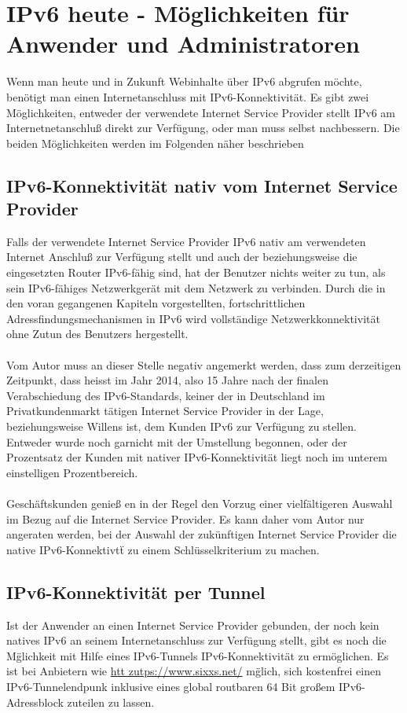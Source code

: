 \documentclass[a4paper,12pt]{scrartcl}
\begin{document}
\clearpage
\section{IPv6 heute - Möglichkeiten für Anwender und Administratoren}
Wenn man heute und in Zukunft Webinhalte \"uber IPv6 abgrufen m\"ochte, ben\"otigt man einen Internetanschluss mit IPv6-Konnektivit\"at. Es gibt zwei M\"oglichkeiten, entweder der verwendete Internet Service Provider stellt IPv6 am Internetnetanschlu{\ss} direkt zur Verf\"ugung, oder man muss selbst nachbessern. Die beiden M\"oglichkeiten werden im Folgenden n\"aher beschrieben

\subsection{IPv6-Konnektivit\"at nativ vom Internet Service Provider}
Falls der verwendete Internet Service Provider IPv6 nativ am verwendeten Internet Anschlu{\ss} zur Verf\"ugung stellt und auch der beziehungsweise die eingesetzten Router IPv6-f\"ahig sind, hat der Benutzer nichts weiter zu tun, als sein IPv6-f\"ahiges Netzwerkger\"at mit dem Netzwerk zu verbinden. Durch die in den voran gegangenen Kapiteln vorgestellten, fortschrittlichen Adressfindungsmechanismen in IPv6 wird vollst\"andige Netzwerkkonnektivit\"at ohne Zutun des Benutzers hergestellt.\\
\\
Vom Autor muss an dieser Stelle negativ angemerkt werden, dass zum derzeitigen Zeitpunkt, dass heisst im Jahr 2014, also 15 Jahre nach der finalen Verabschiedung des IPv6-Standards,  keiner der in Deutschland im Privatkundenmarkt t\"atigen Internet Service Provider in der Lage, beziehungsweise Willens ist, dem Kunden IPv6 zur Verf\"ugung zu stellen. Entweder wurde noch garnicht mit der Umstellung begonnen, oder der Prozentsatz der Kunden mit nativer IPv6-Konnektivit\"at liegt noch im unterem einstelligen Prozentbereich.\\
\\
Gesch\"aftskunden genie{\ss} en in der Regel den Vorzug einer vielf\"altigeren Auswahl im Bezug auf die Internet Service Provider. Es kann daher vom Autor nur angeraten werden, bei der Auswahl der zuk\"unftigen Internet Service Provider die native IPv6-Konnektivt\"t zu einem Schl\"usselkriterium zu machen.

\subsection{IPv6-Konnektivit\"at per Tunnel}
Ist der Anwender an einen Internet Service Provider gebunden, der noch kein natives IPv6 an seinem Internetanschluss zur Verf\"ugung stellt, gibt es noch die M\"glichkeit mit Hilfe eines IPv6-Tunnels IPv6-Konnektivit\"at zu erm\"oglichen. Es ist bei Anbietern wie \url{htt zutps://www.sixxs.net/} m\"glich, sich kostenfrei einen IPv6-Tunnelendpunk inklusive eines global routbaren 64 Bit gro{\ss}em IPv6-Adressblock zuteilen zu lassen. 
\end{document}
